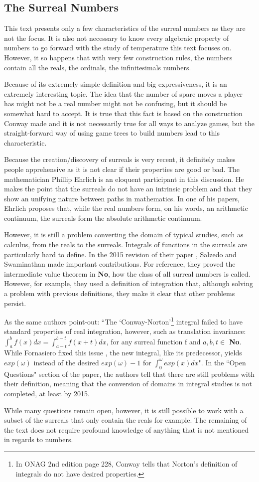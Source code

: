 \subsection*{The Surreal Numbers}

This text presents only a few characteristics of the surreal numbers as they are not the focus. It is also not necessary to know every algebraic property of numbers to go forward with the study of temperature this text focuses on. However, it so happens that with very few construction rules, the numbers contain all the reals, the ordinals, the infinitesimals numbers.

Because of its extremely simple definition and big expressiveness, it is an extremely interesting topic. The idea that the number of spare moves a player has might not be a real number might not be confusing, but it should be somewhat hard to accept. It is true that this fact is based on the construction Conway made and it is not necessarily true for all ways to analyze games, but the straight-forward way of using game trees to build numbers lead to this characteristic.

Because the creation/discovery of surreals is very recent, it definitely makes people apprehensive as it is not clear if their properties are good or bad. The mathematician Phillip Ehrlich is an eloquent participant in this discussion. He makes the point that the surreals do not have an intrinsic problem and that they show an unifying nature between paths in mathematics. In one of his papers, Ehrlich proposes that, while the real numbers form, on his words, an arithmetic continuum, the surreals form the absolute arithmetic continuum\cite{7}.

However, it is still a problem converting the domain of typical studies, such as calculus, from the reals to the surreals. Integrals of functions in the surreals are particularly hard to define. In the 2015 revision of their paper \cite{8}, Salzedo and Swaminathan made important contributions. For reference, they proved the intermediate value theorem in \textbf{No}, how the class of all surreal numbers is called. However, for example, they used a definition of integration that, although solving a problem with previous definitions, they make it clear that other problems persist.

As the same authors point-out: ``The `Conway-Norton'\footnote{In ONAG 2nd edition page 228, Conway  tells that Norton's definition of integrals do not have desired properties.}
integral failed to have standard properties of real integration, however, such as translation
invariance: $\int_a^bf(x)dx = \int_{a-t}^{b-t}f(x+t)dx$, for any surreal function f and $a,b,t\in$ \textbf{No}. While Fornasiero fixed this issue \cite{9}, the new integral, like its predecessor, yields
$exp(\omega)$ instead of the desired $exp(\omega)-1$ for $\int_0^{\omega}exp(x)dx$". In the ``Open Questions" section of  the paper, the authors tell that there are still problems with their definition, meaning that the conversion of domains in integral studies is not completed, at least by 2015.

While many questions remain open, however, it is still possible to work with a subset of the surreals that only contain the reals for example. The remaining of the text does not require profound knowledge of anything that is not mentioned in regards to numbers.









